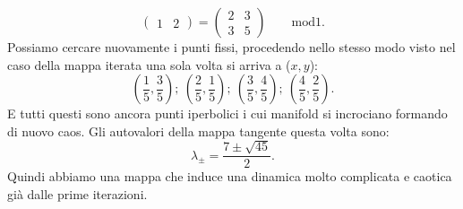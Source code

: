 \begin{exmp}
\[\begin{pmatrix}
	    1 & 2
	\end{pmatrix} 
	= 
	\begin{pmatrix} 
	    2 & 3\\
	    3 & 5
	\end{pmatrix} 
	\qquad \text{mod}1
    .\] 
    Possiamo cercare nuovamente i punti fissi, procedendo nello stesso modo visto nel caso della mappa iterata una sola volta si arriva a ($x, y$):
    \[
        \left(\frac{1}{5}, \frac{3}{5}\right); \ \left(\frac{2}{5}, \frac{1}{5}\right); \ 
	\left(\frac{3}{5}, \frac{4}{5}\right); \ \left(\frac{4}{5}, \frac{2}{5}\right)
    .\] 
    E tutti questi sono ancora punti iperbolici i cui manifold si incrociano formando di nuovo caos. Gli autovalori della mappa tangente questa volta sono:
    \[
        \lambda_{\pm} = \frac{7 \pm \sqrt{45}}{2}
    .\] 
    Quindi abbiamo una mappa che induce una dinamica molto complicata e caotica già dalle prime iterazioni.
\end{exmp}
\noindent
